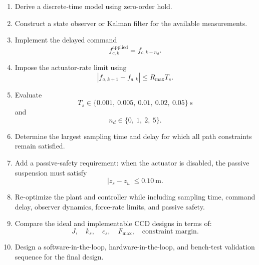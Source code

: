 \begin{enumerate}
    \item Derive a discrete-time model using zero-order hold.

    \item Construct a state observer or Kalman filter for the available
    measurements.

    \item Implement the delayed command
    \begin{equation}
    f_{c,k}^{\mathrm{applied}}
    =
    f_{c,k-n_d}.
    \end{equation}

    \item Impose the actuator-rate limit using
    \begin{equation}
    |f_{a,k+1}-f_{a,k}|
    \leq
    R_{\max}T_s.
    \end{equation}

    \item Evaluate
    \begin{equation}
    T_s
    \in
    \{0.001,\ 0.005,\ 0.01,\ 0.02,\ 0.05\}~\mathrm{s}
    \end{equation}
    and
    \begin{equation}
    n_d
    \in
    \{0,\ 1,\ 2,\ 5\}.
    \end{equation}

    \item Determine the largest sampling time and delay for which all path
    constraints remain satisfied.

    \item Add a passive-safety requirement: when the actuator is disabled,
    the passive suspension must satisfy
    \begin{equation}
    |z_s-z_u|
    \leq
    0.10~\mathrm{m}.
    \end{equation}

    \item Re-optimize the plant and controller while including sampling time,
    command delay, observer dynamics, force-rate limits, and passive safety.

    \item Compare the ideal and implementable CCD designs in terms of:
    \begin{equation}
    J,
    \quad
    k_s,
    \quad
    c_s,
    \quad
    F_{\max},
    \quad
    \text{constraint margin}.
    \end{equation}

    \item Design a software-in-the-loop, hardware-in-the-loop, and bench-test
    validation sequence for the final design.
\end{enumerate}


